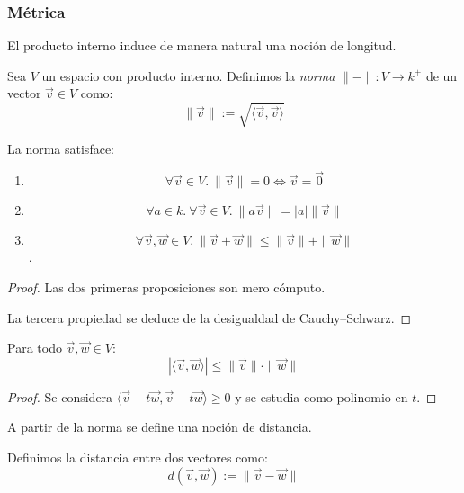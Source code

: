 \documentclass[10pt]{article}
\begin{document}
\subsubsection{Métrica}

El producto interno induce de manera natural una noción de longitud.

\begin{definition}
  Sea $V$ un espacio con producto interno. Definimos la \textit{norma} $\|-\| : V \to k^+ $ de un vector $\vec{v} \in V$ como:
  \[ \|\vec{v}\| := \sqrt{\langle \vec{v}, \vec{v} \rangle} \]
\end{definition}

\begin{theorem}
  La norma satisface:
  \begin{enumerate}
    \item 
      \[ \forall \vec{v} \in V.\ \|\vec{v}\| = 0 \iff \vec{v} = \vec{0} \]
    \item 
      \[ \forall a \in k.\ \forall \vec{v} \in V.\ \|a\vec{v}\| = |a|\|\vec{v}\| \]
    \item 
      \[ \forall \vec{v}, \vec{w} \in V.\ \|\vec{v} + \vec{w}\| \le \|\vec{v}\| + \|\vec{w}\| \].
  \end{enumerate}
\end{theorem}

\begin{proof}
  Las dos primeras proposiciones son mero cómputo.

  La tercera propiedad se deduce de la desigualdad de Cauchy--Schwarz.
\end{proof}

\begin{theorem}
  Para todo $\vec{v}, \vec{w} \in V$:
  \[ |\langle \vec{v}, \vec{w} \rangle| \le \|\vec{v}\| \cdot \|\vec{w}\| \]
\end{theorem}

\begin{proof}
  Se considera $\langle \vec{v} - t\vec{w}, \vec{v} - t\vec{w} \rangle \ge 0$ y se estudia como polinomio en $t$.
\end{proof}

A partir de la norma se define una noción de distancia.

\begin{definition}[Distancia]
  Definimos la distancia entre dos vectores como:
  \[ d(\vec{v}, \vec{w}) := \|\vec{v} - \vec{w}\| \]
\end{definition}
\end{document}
